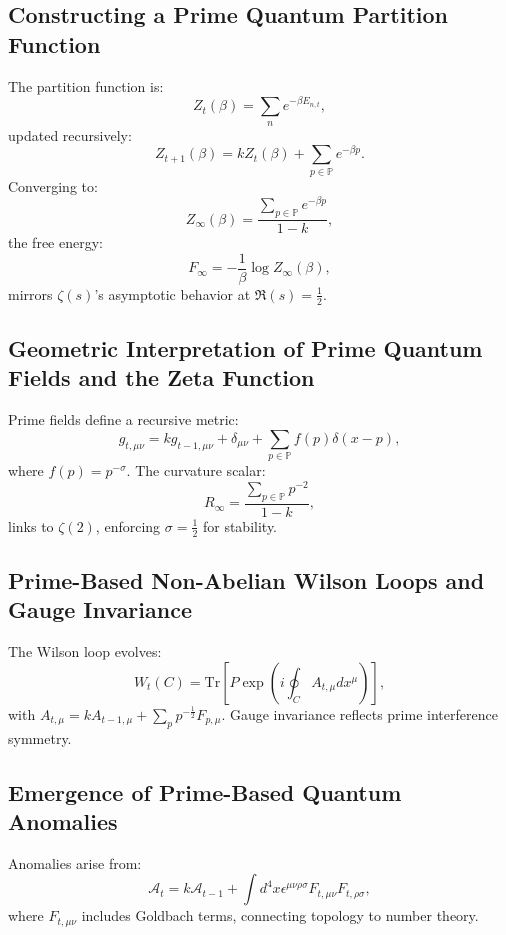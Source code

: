 \documentclass[11pt]{article}
\theoremstyle{plain}
\begin{document}
\subsection{Constructing a Prime Quantum Partition Function}
The partition function is:
\begin{equation}
    Z_t(\beta) = \sum_n e^{-\beta E_{n,t}},
\end{equation}
updated recursively:
\begin{equation}
    Z_{t+1}(\beta) = k Z_t(\beta) + \sum_{p \in \mathbb{P}} e^{-\beta p}.
\end{equation}
Converging to:
\begin{equation}
    Z_\infty(\beta) = \frac{\sum_{p \in \mathbb{P}} e^{-\beta p}}{1 - k},
\end{equation}
the free energy:
\begin{equation}
    F_\infty = -\frac{1}{\beta} \log Z_\infty(\beta),
\end{equation}
mirrors \( \zeta(s) \)’s asymptotic behavior at \( \Re(s) = \frac{1}{2} \).

\subsection{Geometric Interpretation of Prime Quantum Fields and the Zeta Function}
Prime fields define a recursive metric:
\begin{equation}
    g_{t,\mu\nu} = k g_{t-1,\mu\nu} + \delta_{\mu\nu} + \sum_{p \in \mathbb{P}} f(p) \delta(x - p),
\end{equation}
where \( f(p) = p^{-\sigma} \). The curvature scalar:
\begin{equation}
    R_\infty = \frac{\sum_{p \in \mathbb{P}} p^{-2}}{1 - k},
\end{equation}
links to \( \zeta(2) \), enforcing \( \sigma = \frac{1}{2} \) for stability.

\subsection{Prime-Based Non-Abelian Wilson Loops and Gauge Invariance}
The Wilson loop evolves:
\begin{equation}
    W_t(C) = \text{Tr} \left[ P \exp \left( i \oint_C A_{t,\mu} dx^\mu \right) \right],
\end{equation}
with \( A_{t,\mu} = k A_{t-1,\mu} + \sum_{p} p^{-\frac{1}{2}} F_{p,\mu} \). Gauge invariance reflects prime interference symmetry.

\subsection{Emergence of Prime-Based Quantum Anomalies}
Anomalies arise from:
\begin{equation}
    \mathcal{A}_t = k \mathcal{A}_{t-1} + \int d^4x \epsilon^{\mu\nu\rho\sigma} F_{t,\mu\nu} F_{t,\rho\sigma},
\end{equation}
where \( F_{t,\mu\nu} \) includes Goldbach terms, connecting topology to number theory.
\end{document}
